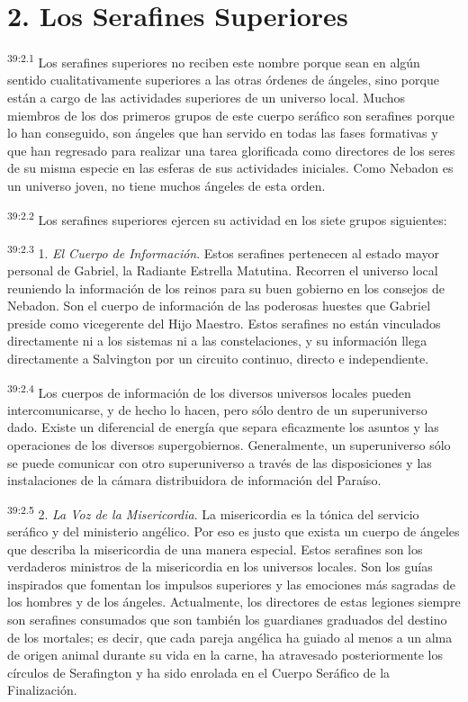 \section*{2. Los Serafines Superiores}
\par
\textsuperscript{39:2.1} Los serafines superiores no reciben este nombre porque sean en algún sentido cualitativamente superiores a las otras órdenes de ángeles, sino porque están a cargo de las actividades superiores de un universo local. Muchos miembros de los dos primeros grupos de este cuerpo seráfico son serafines porque lo han conseguido, son ángeles que han servido en todas las fases formativas y que han regresado para realizar una tarea glorificada como directores de los seres de su misma especie en las esferas de sus actividades iniciales. Como Nebadon es un universo joven, no tiene muchos ángeles de esta orden.

\par
\textsuperscript{39:2.2} Los serafines superiores ejercen su actividad en los siete grupos siguientes:

\par
\textsuperscript{39:2.3} 1. \textit{El Cuerpo de Información}. Estos serafines pertenecen al estado mayor personal de Gabriel, la Radiante Estrella Matutina. Recorren el universo local reuniendo la información de los reinos para su buen gobierno en los consejos de Nebadon. Son el cuerpo de información de las poderosas huestes que Gabriel preside como vicegerente del Hijo Maestro. Estos serafines no están vinculados directamente ni a los sistemas ni a las constelaciones, y su información llega directamente a Salvington por un circuito continuo, directo e independiente.

\par
\textsuperscript{39:2.4} Los cuerpos de información de los diversos universos locales pueden intercomunicarse, y de hecho lo hacen, pero sólo dentro de un superuniverso dado. Existe un diferencial de energía que separa eficazmente los asuntos y las operaciones de los diversos supergobiernos. Generalmente, un superuniverso sólo se puede comunicar con otro superuniverso a través de las disposiciones y las instalaciones de la cámara distribuidora de información del Paraíso.

\par
\textsuperscript{39:2.5} 2. \textit{La Voz de la Misericordia}. La misericordia es la tónica del servicio seráfico y del ministerio angélico. Por eso es justo que exista un cuerpo de ángeles que describa la misericordia de una manera especial. Estos serafines son los verdaderos ministros de la misericordia en los universos locales. Son los guías inspirados que fomentan los impulsos superiores y las emociones más sagradas de los hombres y de los ángeles. Actualmente, los directores de estas legiones siempre son serafines consumados que son también los guardianes graduados del destino de los mortales; es decir, que cada pareja angélica ha guiado al menos a un alma de origen animal durante su vida en la carne, ha atravesado posteriormente los círculos de Serafington y ha sido enrolada en el Cuerpo Seráfico de la Finalización.


